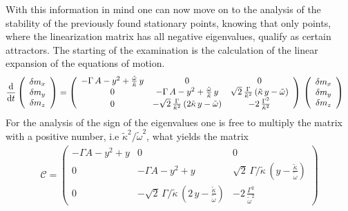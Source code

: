With this information in mind one can now move on to the analysis of the stability of the previously found stationary points, knowing that only points, where the linearization matrix has all negative eigenvalues, qualify as certain attractors. The starting of the examination is the calculation of the linear expansion of the equations of motion.
\begin{align*}
    \frac{\text{d}}{\text{d}t}\left(\begin{array}{c}
         \delta m_x\\
         \delta m_y\\
         \delta m_z
    \end{array}\right)&=\left( \begin{array}{ccc}
        -\Gamma\,A-y^2+\frac{\tilde{\omega}}{\tilde{\kappa}}\,y&  0 & 0\\
        0 & -\Gamma\,A-y^2+\frac{\tilde{\omega}}{\tilde{\kappa}}\,y & \sqrt{2}\,\frac{\Gamma}{\tilde{\kappa}^2}\,(\tilde{\kappa}\,y-\tilde{\omega})\\
        0 &  -\sqrt{2}\,\frac{\Gamma}{\tilde{\kappa}^2}\,(2\tilde{\kappa}\,y-\tilde{\omega}) & -2\,\frac{\Gamma^2}{\tilde{\kappa}^2}
    \end{array} \right)\,\left(\begin{array}{c}
         \delta m_x\\
         \delta m_y\\
         \delta m_z
    \end{array}\right)
\end{align*}
For the analysis of the sign of the eigenvalues one is free to multiply the matrix with a positive number, i.e $\tilde{\kappa}^2/\tilde{\omega}^2$, what yields the matrix
\begin{align*}
    \mathcal{C}=\left( \begin{array}{ccc}
        -\Gamma A-{y}^2+{y}&  0 & 0\\
        0 & -\Gamma A-{y}^2+{y}& \sqrt{2}\,\Gamma/\tilde{\kappa}\,({y}-\frac{\tilde{\kappa}}{\tilde{\omega}})\\
        0 &  -\sqrt{2}\,\Gamma/\tilde{\kappa}\,(2\,{y}-\frac{\tilde{\kappa}}{\tilde{\omega}}) & -2\,\frac{\Gamma^2}{\tilde{\omega}^2}
    \end{array} \right)
\end{align*}
